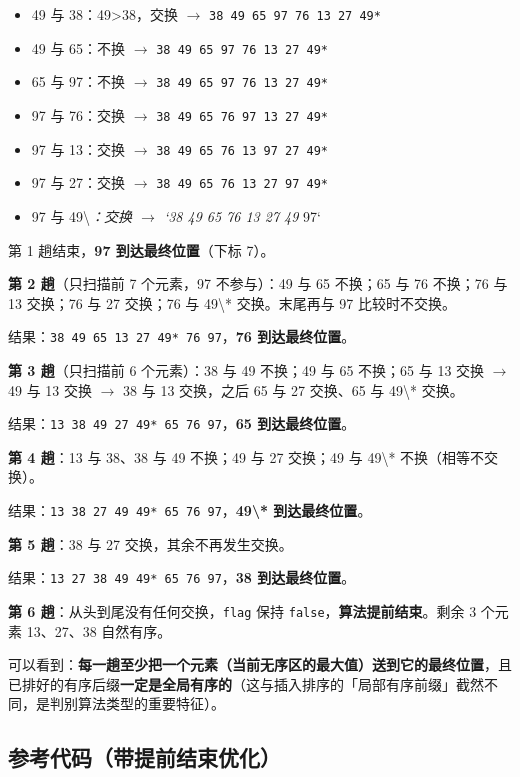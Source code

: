 \documentclass[11pt,openany,UTF8]{ctexbook}
\begin{document}
\begin{itemize}
\item 49 与 38：49>38，交换 $\to$ \texttt{38 49 65 97 76 13 27 49*}
\item 49 与 65：不换 $\to$ \texttt{38 49 65 97 76 13 27 49*}
\item 65 与 97：不换 $\to$ \texttt{38 49 65 97 76 13 27 49*}
\item 97 与 76：交换 $\to$ \texttt{38 49 65 76 97 13 27 49*}
\item 97 与 13：交换 $\to$ \texttt{38 49 65 76 13 97 27 49*}
\item 97 与 27：交换 $\to$ \texttt{38 49 65 76 13 27 97 49*}
\item 97 与 49\textbackslash{}\emph{：交换 $\to$ `38 49 65 76 13 27 49} 97`
\end{itemize}
第 1 趟结束，\textbf{97 到达最终位置}（下标 7）。

\textbf{第 2 趟}（只扫描前 7 个元素，97 不参与）：49 与 65 不换；65 与 76 不换；76 与 13 交换；76 与 27 交换；76 与 49\textbackslash{}* 交换。末尾再与 97 比较时不交换。

结果：\texttt{38 49 65 13 27 49* 76 97}，\textbf{76 到达最终位置}。

\textbf{第 3 趟}（只扫描前 6 个元素）：38 与 49 不换；49 与 65 不换；65 与 13 交换 $\to$ 49 与 13 交换 $\to$ 38 与 13 交换，之后 65 与 27 交换、65 与 49\textbackslash{}* 交换。

结果：\texttt{13 38 49 27 49* 65 76 97}，\textbf{65 到达最终位置}。

\textbf{第 4 趟}：13 与 38、38 与 49 不换；49 与 27 交换；49 与 49\textbackslash{}* 不换（相等不交换）。

结果：\texttt{13 38 27 49 49* 65 76 97}，\textbf{49\textbackslash{}* 到达最终位置}。

\textbf{第 5 趟}：38 与 27 交换，其余不再发生交换。

结果：\texttt{13 27 38 49 49* 65 76 97}，\textbf{38 到达最终位置}。

\textbf{第 6 趟}：从头到尾没有任何交换，\texttt{flag} 保持 \texttt{false}，\textbf{算法提前结束}。剩余 3 个元素 13、27、38 自然有序。

可以看到：\textbf{每一趟至少把一个元素（当前无序区的最大值）送到它的最终位置}，且已排好的有序后缀\textbf{一定是全局有序的}（这与插入排序的「局部有序前缀」截然不同，是判别算法类型的重要特征）。

\subsection{参考代码（带提前结束优化）}
\end{document}
